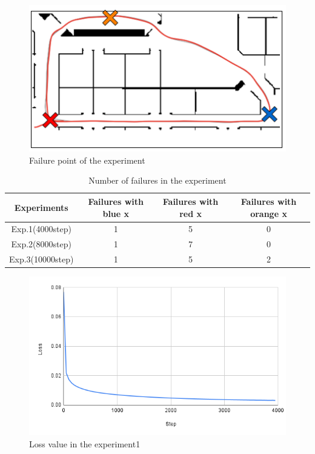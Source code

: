 \begin{figure}[h]
  \centering
  \includegraphics[keepaspectratio, scale=0.5]{images/result1.2.png}
  \caption{Failure point of the experiment}
  \label{Fig:result1.2}
  \end{figure}

\newpage
\begin{table}[h]
  \centering
  \caption{Number of failures in the experiment}
  \begin{tabular}{|c|c|c|c|} \hline
    Experiments & Failures with blue x & Failures with red x & Failures with orange x\\ \hline
    Exp.1(4000step) & 1 & 5 & 0 \\ \hline
    Exp.2(8000step) & 1 & 7 & 0 \\ \hline
    Exp.3(10000step) & 1 & 5 & 2 \\ \hline
  \end{tabular}
  \label{tb:fail1.2}
\end{table}

\vspace{20mm}
\begin{figure}[h]
  \centering
  \includegraphics[keepaspectratio, scale=0.5]{images/exp1.2_4000.png}
  \caption{Loss value in the experiment1}
  \label{Fig:exp1.2_4000}
  \end{figure}
  

